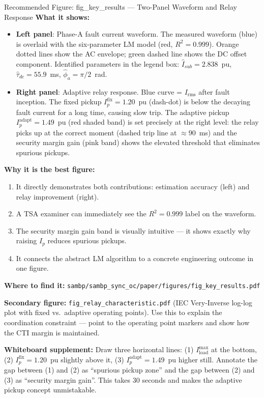 \documentclass[12pt,a4paper]{article}
\begin{document}
\begin{keybox}{Recommended Figure: fig\_key\_results --- Two-Panel Waveform and Relay Response}
\textbf{What it shows:}
\begin{itemize}[nosep]
  \item \textbf{Left panel}: Phase-A fault current waveform. The measured waveform (blue) is overlaid with the six-parameter LM model (red, $R^2 = 0.999$). Orange dotted lines show the AC envelope; green dashed line shows the DC offset component. Identified parameters in the legend box: $\hat{I}_{sub} = 2.838$~pu, $\hat{\tau}_{dc} = 55.9$~ms, $\hat{\phi}_a = \pi/2$~rad.
  \item \textbf{Right panel}: Adaptive relay response. Blue curve = $I_\mathrm{rms}$ after fault inception. The fixed pickup $I_p^\mathrm{fix} = 1.20$~pu (dash-dot) is below the decaying fault current for a long time, causing slow trip. The adaptive pickup $I_p^\mathrm{adapt} = 1.49$~pu (red shaded band) is set precisely at the right level: the relay picks up at the correct moment (dashed trip line at $\approx 90$~ms) and the security margin gain (pink band) shows the elevated threshold that eliminates spurious pickups.
\end{itemize}

\textbf{Why it is the best figure:}
\begin{enumerate}[nosep]
  \item It directly demonstrates both contributions: estimation accuracy (left) and relay improvement (right).
  \item A TSA examiner can immediately see the $R^2 = 0.999$ label on the waveform.
  \item The security margin gain band is visually intuitive --- it shows exactly why raising $I_p$ reduces spurious pickups.
  \item It connects the abstract LM algorithm to a concrete engineering outcome in one figure.
\end{enumerate}

\textbf{Where to find it:} \texttt{sambp/sambp\_sync\_oc/paper/figures/fig\_key\_results.pdf}

\textbf{Secondary figure:} \texttt{fig\_relay\_characteristic.pdf} (IEC Very-Inverse log-log plot with fixed vs.\ adaptive operating points). Use this to explain the coordination constraint --- point to the operating point markers and show how the CTI margin is maintained.

\textbf{Whiteboard supplement:} Draw three horizontal lines: (1) $I_\mathrm{load}^\mathrm{max}$ at the bottom, (2) $I_p^\mathrm{fix} = 1.20$~pu slightly above it, (3) $I_p^\mathrm{adapt} = 1.49$~pu higher still. Annotate the gap between (1) and (2) as ``spurious pickup zone'' and the gap between (2) and (3) as ``security margin gain''. This takes 30 seconds and makes the adaptive pickup concept unmistakable.
\end{keybox}
\end{document}
